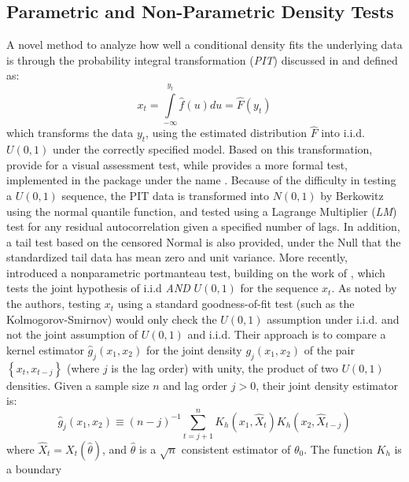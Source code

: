 \subsection{Parametric and Non-Parametric Density Tests}
A novel method to analyze how well a conditional density fits the underlying data
is through the probability integral transformation (\emph{PIT}) discussed in
\cite{Rosenblatt1952} and defined as:
\begin{equation}
{x_t} = \int\limits_{ - \infty }^{{y_t}} {\hat f\left( u \right)du = \hat F\left( {{y_t}} \right)}
\end{equation}
which transforms the data $y_t$, using the estimated distribution $\hat F$ into
i.i.d. $U(0,1)$ under the correctly specified model. Based on this transformation,
\cite{Tay1998} provide for a visual assessment test, while \cite{Berkowitz2001}
provides a more formal test, implemented in the package under the name \verb@BerkowitzTest@.
Because of the difficulty in testing a $U(0,1)$ sequence, the PIT data is
transformed into $N(0,1)$ by Berkowitz using the normal quantile function, and
tested using a Lagrange Multiplier (\emph{LM}) test for any residual
autocorrelation given a specified number of lags. In addition, a tail
test based on the censored Normal is also provided, under the Null that the
standardized tail data has mean zero and unit variance. More recently,
\cite{Hong2005} introduced a nonparametric portmanteau test, building on the work
of \cite{Ait-Sahalia1996}, which tests the joint hypothesis of i.i.d \emph{AND} $U(0,1)$
for the sequence $x_t$. As noted by the authors, testing $x_t$ using a standard
goodness-of-fit test (such as the Kolmogorov-Smirnov) would only check the $U(0,1)$
assumption under i.i.d. and not the joint assumption of $U(0,1)$ and i.i.d. Their
approach is to compare a kernel estimator $\hat g_j\left(x_1,x_2\right)$ for the
joint density $g_j\left(x_1,x_2\right)$ of the pair  $\left\{ {x_t,x_{t-j}} \right\}$
(where $j$ is the lag order) with unity, the product of two $U(0,1)$ densities.
Given a sample size $n$ and lag order $j>0$, their joint density estimator is:
\begin{equation}\label{eq:HL1}
{{\hat g}_j}\left( {{x_1},{x_2}} \right) \equiv {\left( {n - j} \right)^{ - 1}}\sum\limits_{t = j + 1}^n {{K_h}\left( {{x_1},{{\hat X}_t}} \right){K_h}\left( {{x_2},{{\hat X}_{t - j}}} \right)}
\end{equation}
where ${{\hat X}_t} = {X_t}\left( {\hat \theta } \right)$, and $\hat \theta$ is a $\sqrt n$ consistent estimator of $\theta_0$. The function $K_h$ is a boundary
